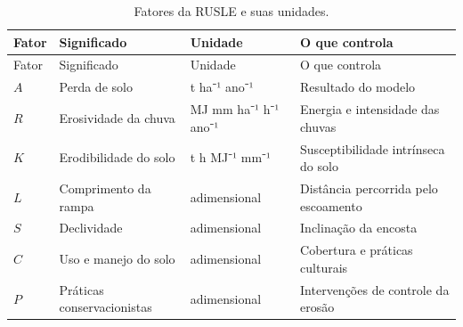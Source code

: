 \documentclass[
  portuguese,
  11pt,
  a4paper,
  open=any]{scrbook}
\begin{document}
\begin{longtable}[]{@{}
  >{\raggedright\arraybackslash}p{}
  >{\raggedright\arraybackslash}p{}
  >{\raggedright\arraybackslash}p{}
  >{\raggedright\arraybackslash}p{}@{}}
\caption{Fatores da RUSLE e suas
unidades.}\label{tbl-rusle}\tabularnewline
\toprule\noalign{}
\begin{minipage}[b]{\linewidth}\raggedright
Fator
\end{minipage} & \begin{minipage}[b]{\linewidth}\raggedright
Significado
\end{minipage} & \begin{minipage}[b]{\linewidth}\raggedright
Unidade
\end{minipage} & \begin{minipage}[b]{\linewidth}\raggedright
O que controla
\end{minipage} \\
\midrule\noalign{}
\endfirsthead
\toprule\noalign{}
\begin{minipage}[b]{\linewidth}\raggedright
Fator
\end{minipage} & \begin{minipage}[b]{\linewidth}\raggedright
Significado
\end{minipage} & \begin{minipage}[b]{\linewidth}\raggedright
Unidade
\end{minipage} & \begin{minipage}[b]{\linewidth}\raggedright
O que controla
\end{minipage} \\
\midrule\noalign{}
\endhead
\bottomrule\noalign{}
\endlastfoot
\(A\) & Perda de solo & t ha⁻¹ ano⁻¹ & Resultado do modelo \\
\(R\) & Erosividade da chuva & MJ mm ha⁻¹ h⁻¹ ano⁻¹ & Energia e
intensidade das chuvas \\
\(K\) & Erodibilidade do solo & t h MJ⁻¹ mm⁻¹ & Susceptibilidade
intrínseca do solo \\
\(L\) & Comprimento da rampa & adimensional & Distância percorrida pelo
escoamento \\
\(S\) & Declividade & adimensional & Inclinação da encosta \\
\(C\) & Uso e manejo do solo & adimensional & Cobertura e práticas
culturais \\
\(P\) & Práticas conservacionistas & adimensional & Intervenções de
controle da erosão \\
\end{longtable}
\end{document}
